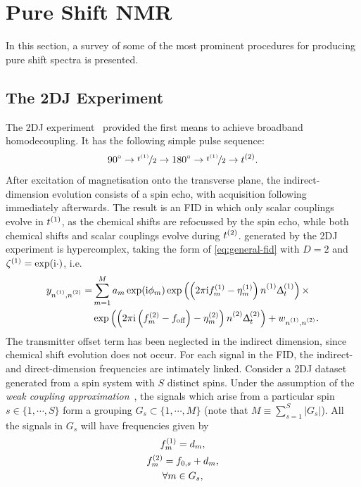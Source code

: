 \section{Pure Shift \acs{NMR}}
In this section, a survey of some of the most prominent procedures for
producing pure shift spectra is presented.
\subsection{The \acs{2DJ} Experiment}
The \ac{2DJ} experiment~\cite{Aue1976, Morris2009} provided the first means to
achieve broadband homodecoupling. It has the following simple pulse sequence:
\[
    \ang{90} \rightarrow \nicefrac{t^{(1)}}{2} \rightarrow \ang{180} \rightarrow \nicefrac{t^{(1)}}{2} \rightarrow t^{(2)}.
\]
After excitation of magnetisation onto the transverse plane, the
indirect-dimension evolution consists of a spin echo, with acquisition
following
immediately afterwards. The result is an \ac{FID} in which only scalar
couplings evolve in $t^{(1)}$, as the chemical shifts are refocussed by the
spin echo, while both chemical shifts and scalar
couplings evolve during $t^{(2)}$.  generated by the \ac{2DJ}
experiment is hypercomplex, taking the form of \cref{eq:general-fid} with
$D=2$ and $\zeta^{(1)} = \exp(\mathrm{i}\cdot)$, i.e.
\begin{equation}%
    \begin{split}%
        y_{\none,\ntwo} =
        &\sum_{m=1}^{M} a_m \exp(\iu \phi_m)
            \exp\left(\left(2 \pi \iu \fonem - \etaonem\right) \none \Dtone\right) \times \\
        &\exp\left(\left(2 \pi \iu  \left(\ftwom - \foff\right)
            - \etatwom\right) \ntwo \Dttwo\right)
            + w_{\none,\ntwo}.
    \end{split}%
    \label{eq:jres-fid}%
\end{equation}%
The transmitter offset term has been neglected in the indirect dimension, since
chemical shift evolution does not occur.
For each signal in the \ac{FID}, the indirect- and direct-dimension
frequencies are intimately linked. Consider a \ac{2DJ} dataset generated from a
spin system with $S$ distinct spins.
Under the assumption of the
\emph{weak coupling approximation}~\cite[Section 2.5.2]{Cavanagh2007},
the signals which arise
from a particular spin $s \in \lbrace 1, \cdots, S \rbrace$ form a grouping $G_s
\subset \lbrace 1, \cdots, M \rbrace$ (note that $M \equiv \sum_{s=1}^S \lvert
G_s \rvert$).
All the signals in $G_s$ will have frequencies given by
\begin{subequations}
    \begin{gather}
        f_m^{(1)} = d_m,\\
        f_m^{(2)} = f_{0,s} + d_m,\\
        \forall m \in G_s\notag,
    \end{gather}%
    \label{eq:f1-f2-2dj}%
\end{subequations}
